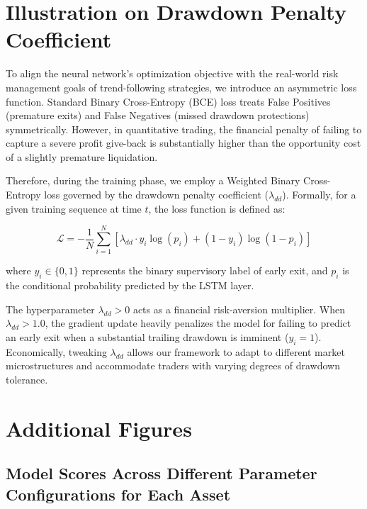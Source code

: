 \documentclass[12pt]{article}
\begin{document}
\newpage

\appendix

\section{Illustration on Drawdown Penalty Coefficient}\label{sec:drawdownpenalty}

To align the neural network's optimization objective with the real-world risk management goals of trend-following strategies, we introduce an asymmetric loss function. Standard Binary Cross-Entropy (BCE) loss treats False Positives (premature exits) and False Negatives (missed drawdown protections) symmetrically. However, in quantitative trading, the financial penalty of failing to capture a severe profit give-back is substantially higher than the opportunity cost of a slightly premature liquidation. 

Therefore, during the training phase, we employ a Weighted Binary Cross-Entropy loss governed by the drawdown penalty coefficient ($\lambda_{dd}$). Formally, for a given training sequence at time $t$, the loss function is defined as:

\setcounter{equation}{0}
\renewcommand{\theequation}{A.\arabic{equation}}

\begin{equation}
\mathcal{L} = - \frac{1}{N} \sum_{i=1}^{N} \left[ \lambda_{dd} \cdot y_i \log(p_i) + (1 - y_i) \log(1 - p_i) \right]
\end{equation}

where $y_i \in \{0, 1\}$ represents the binary supervisory label of early exit, and $p_i$ is the conditional probability predicted by the LSTM layer. 

The hyperparameter $\lambda_{dd} > 0$ acts as a financial risk-aversion multiplier. When $\lambda_{dd} > 1.0$, the gradient update heavily penalizes the model for failing to predict an early exit when a substantial trailing drawdown is imminent ($y_i = 1$). Economically, tweaking $\lambda_{dd}$ allows our framework to adapt to different market microstructures and accommodate traders with varying degrees of drawdown tolerance.

\section{Additional Figures}

\subsection{Model Scores Across Different Parameter Configurations for Each Asset}\label{subsec:scoresDistribution}
\end{document}
